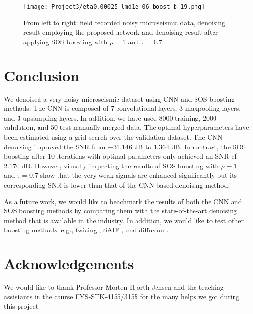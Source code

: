 \documentclass[a4paper]{article}
\begin{document}
\begin{figure}[H]
  \centering
  \texttt{[image: Project3/eta0.00025\_lmd1e-06\_boost\_b\_19.png]}
  \caption{From left to right: field recorded noisy microseismic data, denoising result employing the proposed network and denoising result after applying SOS boosting with $\rho=1$ and $\tau=0.7$.}
    \label{boostb2}
\end{figure}

\section{Conclusion}

We denoised a very noisy microseismic dataset using CNN and SOS boosting methods. The CNN is composed of $7$ convolutional layers, $3$ maxpooling layers, and $3$ upsampling layers. In addition, we have used $8000$ training, $2000$ validation, and $50$ test manually merged data. The optimal hyperparameters have been estimated using a grid search over the validation dataset. The CNN denoising improved the SNR from $-31.146$ dB to $1.364$ dB. In contrast, the SOS boosting after $10$ iterations with optimal parameters only achieved an SNR of $2.170$ dB. However, visually inspecting the results of SOS boosting with $\rho=1$ and $\tau=0.7$ show that the very weak signals are enhanced significantly but its corresponding SNR is lower than that of the CNN-based denoising method.

As a future work, we would like to benchmark the results of both the CNN and SOS boosting methods by comparing them with the state-of-the-art denoising method that is available in the industry. In addition, we would like to test other boosting methods, e.g., twicing \cite{Tukey77}, SAIF \cite{EsfandaraniM14}, and diffusion \cite{SzlamMC08}.


\section{Acknowledgements}
We would like to thank Professor Morten Hjorth-Jensen and the teaching assistants in the course FYS-STK-4155/3155 for the many helps we got during this project.



%
%


\end{document}
